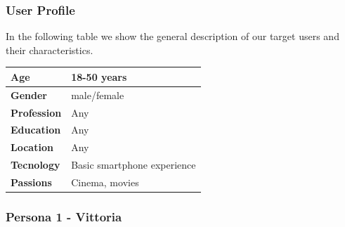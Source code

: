 \documentclass[12pt, a4paper]{article}
\numberwithin{figure}{section}
\begin{document}
\subsubsection{User Profile}
In the following table we show the general description of our target users and their characteristics.
\begin{center}
	\begin{tabular}{ |p{3cm}|P{7cm}|  }
		\hline
		\textbf{Age}        & 18-50 years                 \\
		\hline
		\textbf{Gender}     & male/female                 \\
		\hline
		\textbf{Profession} & Any                         \\
		\hline
		\textbf{Education}  & Any                         \\
		\hline
		\textbf{Location}   & Any                         \\
		\hline
		\textbf{Tecnology}  & Basic smartphone experience \\
		\hline
		\textbf{Passions}   & Cinema, movies              \\
		\hline
	\end{tabular}
\end{center}

\subsubsection{Persona 1 - Vittoria}
\end{document}
